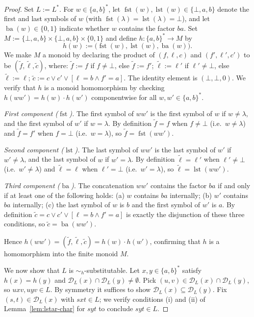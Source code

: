 \documentclass[11pt,a4paper]{article}
\begin{document}
\begin{proof}
Set $L:=L^*$.
For $w\in\{a,b\}^*$, let
$\operatorname{fst}(w),\operatorname{lst}(w)\in\{\bot,a,b\}$ denote the
first and last symbols of $w$ (with
$\operatorname{fst}(\lambda)=\operatorname{lst}(\lambda)=\bot$), and let
$\operatorname{ba}(w)\in\{0,1\}$ indicate whether $w$ contains the factor
$ba$.
Set $M:=\{\bot,a,b\}\times\{\bot,a,b\}\times\{0,1\}$ and define
$h:\{a,b\}^*\to M$ by
\[
  h(w):=\bigl(\operatorname{fst}(w),\operatorname{lst}(w),\operatorname{ba}(w)\bigr).
\]
We make $M$ a monoid by declaring the product of $(f,\ell,c)$ and
$(f',\ell',c')$ to be $(\widetilde{f},\widetilde{\ell},\widetilde{c})$,
where:
$\widetilde{f}:=f$ if $f\ne\bot$, else $\widetilde{f}:=f'$;
$\widetilde{\ell}:=\ell'$ if $\ell'\ne\bot$, else $\widetilde{\ell}:=\ell$;
$\widetilde{c}:=c\vee c'\vee[\ell=b\wedge f'=a]$.
The identity element is $(\bot,\bot,0)$.
We verify that $h$ is a monoid homomorphism by checking
$h(ww')=h(w)\cdot h(w')$ componentwise for all $w,w'\in\{a,b\}^*$.

\emph{First component ($\operatorname{fst}$).}
The first symbol of $ww'$ is the first symbol of $w$ if $w\ne\lambda$,
and the first symbol of $w'$ if $w=\lambda$.
By definition $\widetilde{f}=f$ when $f\ne\bot$ (i.e.\ $w\ne\lambda$)
and $\widetilde{f}=f'$ when $f=\bot$ (i.e.\ $w=\lambda$), so
$\widetilde{f}=\operatorname{fst}(ww')$.

\emph{Second component ($\operatorname{lst}$).}
The last symbol of $ww'$ is the last symbol of $w'$ if $w'\ne\lambda$,
and the last symbol of $w$ if $w'=\lambda$.
By definition $\widetilde{\ell}=\ell'$ when $\ell'\ne\bot$
(i.e.\ $w'\ne\lambda$) and $\widetilde{\ell}=\ell$ when $\ell'=\bot$
(i.e.\ $w'=\lambda$), so $\widetilde{\ell}=\operatorname{lst}(ww')$.

\emph{Third component ($\operatorname{ba}$).}
The concatenation $ww'$ contains the factor $ba$ if and only if at least
one of the following holds: (a) $w$ contains $ba$ internally; (b) $w'$
contains $ba$ internally; (c) the last symbol of $w$ is $b$ and the
first symbol of $w'$ is $a$.
By definition $\widetilde{c}=c\vee c'\vee[\ell=b\wedge f'=a]$ is
exactly the disjunction of these three conditions, so
$\widetilde{c}=\operatorname{ba}(ww')$.

Hence $h(ww')=(\widetilde{f},\widetilde{\ell},\widetilde{c})=h(w)\cdot h(w')$,
confirming that $h$ is a homomorphism into the finite monoid $M$.

We now show that $L$ is $\sim_h$-substitutable.
Let $x,y\in\{a,b\}^*$ satisfy $h(x)=h(y)$ and
$\mathcal{D}_L(x)\cap\mathcal{D}_L(y)\ne\emptyset$.
Pick $(u,v)\in\mathcal{D}_L(x)\cap\mathcal{D}_L(y)$, so
$uxv,uyv\in L$.
By symmetry it suffices to show
$\mathcal{D}_L(x)\subseteq\mathcal{D}_L(y)$.
Fix $(s,t)\in\mathcal{D}_L(x)$ with $sxt\in L$; we verify conditions
\textup{(i)} and \textup{(ii)} of Lemma~\ref{lem:lstar-char} for $syt$
to conclude $syt\in L$.


\end{proof}
\end{document}
